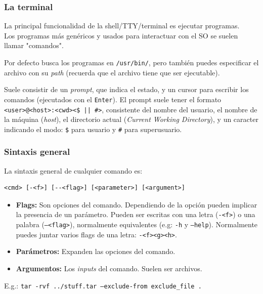 \documentclass[aspectratio=43]{beamer}
\begin{document}
\begin{frame}
    \frametitle{La terminal}
    La principal funcionalidad de la shell/TTY/terminal es ejecutar programas.\\
    Los programas más genéricos y usados para interactuar con el SO se suelen llamar "comandos".\newline

    Por defecto busca los programas en \texttt{/usr/bin/}, pero también puedes especificar el archivo con su \textit{path} (recuerda que el archivo tiene que ser ejecutable).\newline

    Suele consistir de un \textit{prompt}, que indica el estado, y un cursor para escribir los comandos (ejecutados con el \texttt{Enter}). El prompt suele tener el formato \texttt{<user>@<host>:<cwd><\$ || \#>}, consistente del nombre del usuario, el nombre de la máquina (\textit{host}), el directorio actual (\textit{Current Working Directory}), y un caracter indicando el modo: \texttt{\$} para usuario y \texttt{\#} para superusuario.

\end{frame}


\begin{frame}[fragile]  %
    \frametitle{Sintaxis general}

    La sintaxis general de cualquier comando es:\\

    \begin{block}{}  %
        \begin{verbatim}
<cmd> [-<f>] [--<flag>] [<parameter>] [<argument>]
        \end{verbatim}
    \end{block}

    \begin{itemize}
        \item \textbf{Flags:} Son opciones del comando. Dependiendo de la opción pueden implicar la presencia de un parámetro. Pueden ser escritas con una letra (\texttt{-<f>}) o una palabra (\texttt{--<flag>}), normalmente equivalentes (e.g: \texttt{-h} y \texttt{--help}). Normalmente puedes juntar varios flags de una letra: \texttt{-<f><g><h>}.
        \item \textbf{Parámetros:} Expanden las opciones del comando.
        \item \textbf{Argumentos:} Los \textit{inputs} del comando. Suelen ser archivos.
    \end{itemize}
    
    E.g.: \texttt{tar -rvf ../stuff.tar --exclude-from exclude\_file .}

\end{frame}
\end{document}
